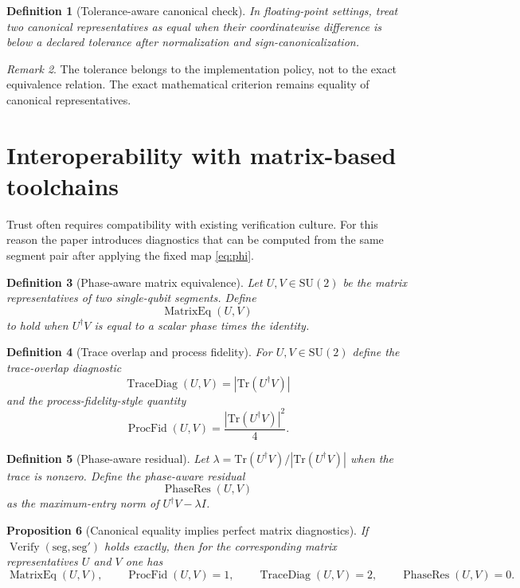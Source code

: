 \documentclass[11pt]{article}
\newtheorem{definition}{Definition}[section]
\newtheorem{proposition}[definition]{Proposition}
\theoremstyle{remark}
\newtheorem{remark}[definition]{Remark}
\newcommand{\SU}{\mathrm{SU}}
\newcommand{\Id}{I}
\newcommand{\Verify}{\operatorname{Verify}}
\newcommand{\MatrixEq}{\operatorname{MatrixEq}}
\newcommand{\TraceDiag}{\operatorname{TraceDiag}}
\newcommand{\ProcFid}{\operatorname{ProcFid}}
\newcommand{\PhaseRes}{\operatorname{PhaseRes}}
\begin{document}
\begin{definition}[Tolerance-aware canonical check]
In floating-point settings, treat two canonical representatives as equal when
their coordinatewise difference is below a declared tolerance after
normalization and sign-canonicalization.
\end{definition}

\begin{remark}
The tolerance belongs to the implementation policy, not to the exact
equivalence relation. The exact mathematical criterion remains equality of
canonical representatives.
\end{remark}

\section{Interoperability with matrix-based toolchains}

Trust often requires compatibility with existing verification culture. For this
reason the paper introduces diagnostics that can be computed from the same
segment pair after applying the fixed map \eqref{eq:phi}.

\begin{definition}[Phase-aware matrix equivalence]
Let $U,V\in\SU(2)$ be the matrix representatives of two single-qubit segments.
Define
\[
\MatrixEq(U,V)
\]
to hold when $U^\dagger V$ is equal to a scalar phase times the identity.
\end{definition}

\begin{definition}[Trace overlap and process fidelity]
For $U,V\in\SU(2)$ define the trace-overlap diagnostic
\[
\TraceDiag(U,V)=\left|\mathrm{Tr}(U^\dagger V)\right|
\]
and the process-fidelity-style quantity
\[
\ProcFid(U,V)=\frac{\left|\mathrm{Tr}(U^\dagger V)\right|^2}{4}.
\]
\end{definition}

\begin{definition}[Phase-aware residual]
Let $\lambda=\mathrm{Tr}(U^\dagger V)/|\mathrm{Tr}(U^\dagger V)|$ when the trace
is nonzero. Define the phase-aware residual
\[
\PhaseRes(U,V)
\]
as the maximum-entry norm of $U^\dagger V-\lambda \Id$.
\end{definition}

\begin{proposition}[Canonical equality implies perfect matrix diagnostics]
If $\Verify(\mathrm{seg},\mathrm{seg}')$ holds exactly, then for the
corresponding matrix representatives $U$ and $V$ one has
\[
\MatrixEq(U,V),
\qquad
\ProcFid(U,V)=1,
\qquad
\TraceDiag(U,V)=2,
\qquad
\PhaseRes(U,V)=0.
\]
\end{proposition}
\end{document}

